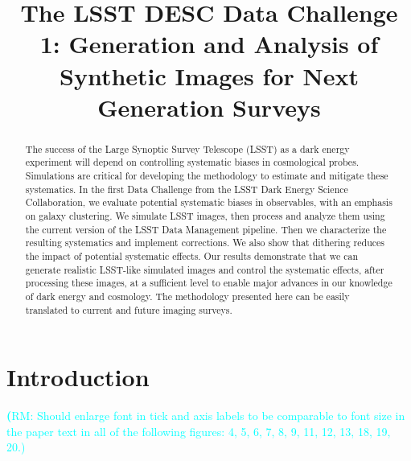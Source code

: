 \documentclass[twocolumn]{aastex62}
\newcommand{\rachel}[1]{{\textcolor{cyan}{{\textbf (RM: #1)}}}}
\begin{document}
\title[LSST DESC DC1]{The LSST DESC Data Challenge 1: Generation and Analysis of Synthetic Images for Next Generation Surveys }


\begin{abstract}

The success of the Large Synoptic Survey Telescope (LSST) as a dark energy experiment will depend on controlling systematic biases in cosmological probes. Simulations are critical for developing the methodology to estimate and mitigate these systematics. In the first Data Challenge from the LSST Dark Energy Science Collaboration, we evaluate potential systematic biases in observables, with an emphasis on galaxy clustering. We simulate LSST images, then process and analyze them using the current version of the LSST Data Management pipeline. Then we characterize the resulting systematics and implement corrections. We also show that dithering reduces the impact of potential systematic effects. Our results demonstrate that we can generate realistic LSST-like simulated images and control the systematic effects, after processing these images, at a sufficient level to enable major advances in our knowledge of dark energy and cosmology. The methodology presented here can be easily translated to current and future imaging surveys.
\end{abstract}



%

\section{Introduction}
\label{sec:intro}

\rachel{Should enlarge font in tick and axis labels to be comparable to font size in the paper
  text in all of the following figures: 4, 5, 6, 7, 8, 9, 11, 12, 13, 18, 19, 20.}
\end{document}
